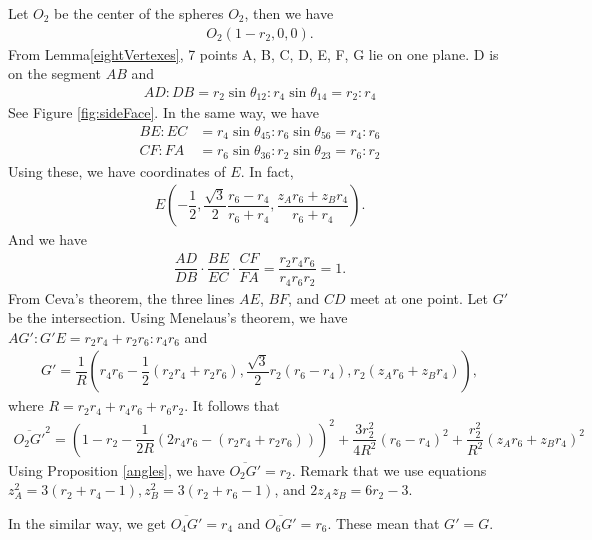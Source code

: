 \documentclass[suppldata, dvipdfmx]{interact}
\theoremstyle{plain}%
\theoremstyle{definition}
\theoremstyle{remark}
\theoremstyle{problemstyle}
\begin{document}
Let $O_2$ be the center of the spheres $O_2$, then we have
\begin{align*}
 O_2(1 - r_2, 0, 0).
\end{align*}
From Lemma\ref{eightVertexes}, 7 points A, B, C, D, E, F, G lie on one plane. D is on
the segment $AB$ and
\begin{align*}
 AD : DB = r_2\sin\theta_{12} : r_4\sin\theta_{14} = r_2 : r_4
\end{align*}
See Figure \ref{fig:sideFace}. In the same way, we have
\begin{align*}
 BE : EC &= r_4\sin\theta_{45} : r_6\sin\theta_{56} = r_4:r_6\\
 CF : FA &= r_6\sin\theta_{36} : r_2\sin\theta_{23} = r_6:r_2
\end{align*}
Using these, we have coordinates of $E$. In fact,
\begin{align*}
 E(-\dfrac{1}{2},\dfrac{\sqrt{3}}{2}\dfrac{r_6-r_4}{r_6 + r_4},
 \dfrac{z_Ar_6 + z_B r_4}{r_6 + r_4}).
\end{align*}
And we have
\begin{align*}
 \dfrac{AD}{DB} \cdot \dfrac{BE}{EC} \cdot \dfrac{CF}{FA} = \dfrac{r_2r_4r_6}{r_4r_6r_2} = 1.
\end{align*}
From Ceva's theorem, the three lines $AE$, $BF$, and $CD$ meet at one
point. Let $G'$ be the intersection. Using Menelaus's theorem, we have
$AG':G'E = r_2r_4 + r_2r_6:r_4r_6$ and
\begin{align*}
 G' = \dfrac{1}{R}(r_4r_6 - \dfrac{1}{2}(r_2r_4 + r_2r_6), 
 \dfrac{\sqrt{3}}{2}r_2(r_6 - r_4), r_2(z_Ar_6 + z_Br_4)),
\end{align*}
where $R = r_2r_4 + r_4r_6 + r_6r_2.$ It follows that
\begin{align*}
 \overline{O_2G'}^2 = (1 - r_2 - \dfrac{1}{2R}(2r_4r_6 - (r_2r_4 +
 r_2r_6)))^2 + \dfrac{3r^2_2}{4R^2}(r_6 - r_4)^2 +
 \dfrac{r_2^2}{R^2}(z_Ar_6 + z_Br_4)^2
\end{align*}
Using Proposition \ref{angles}, we have $\overline{O_2G'} = r_2$.
Remark that we
use equations $z_A^2 = 3(r_2 + r_4 - 1), z_B^2 = 3(r_2 + r_6 - 1)$, and
$2z_Az_B = 6r_2 - 3$.

In the similar way, we get $\overline{O_4G'} = r_4$ and 
$\overline{O_6G'} = r_6$. These mean that $G' = G$.
\end{document}
